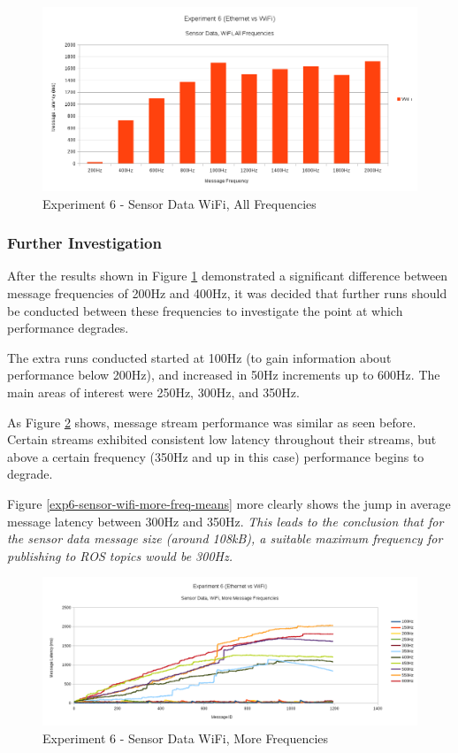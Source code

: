 \documentclass[../dissertation.tex]{subfiles}
\begin{document}
\begin{figure}[H]
\centering
\includegraphics[width=\textwidth]{images/experiment6/sensor_data_wifi_all_freqs_mean.png}
\caption{Experiment 6 - Sensor Data WiFi, All Frequencies}
\label{exp6-sensor-wifi-all-freq-mean}
\end{figure}

\subsubsection{Further Investigation}

After the results shown in Figure \ref{exp6-sensor-wifi-all-freq-mean} demonstrated a significant difference between message frequencies of 200Hz and 400Hz, it was decided that further runs should be conducted between these frequencies to investigate the point at which performance degrades.

The extra runs conducted started at 100Hz (to gain information about performance below 200Hz), and increased in 50Hz increments up to 600Hz. The main areas of interest were 250Hz, 300Hz, and 350Hz.

As Figure \ref{exp6-sensor-wifi-more-freq-stream} shows, message stream performance was similar as seen before. Certain streams exhibited consistent low latency throughout their streams, but above a certain frequency (350Hz and up in this case) performance begins to degrade.

Figure \ref{exp6-sensor-wifi-more-freq-means} more clearly shows the jump in average message latency between 300Hz and 350Hz. \textit{This leads to the conclusion that for the sensor data message size (around 108kB), a suitable maximum frequency for publishing to ROS topics would be 300Hz.}

\begin{figure}[H]
\centering
\includegraphics[width=\textwidth]{images/experiment6/sensor_data_wifi_more_freqs_stream.png}
\caption{Experiment 6 - Sensor Data WiFi, More Frequencies}
\label{exp6-sensor-wifi-more-freq-stream}
\end{figure}
\end{document}
